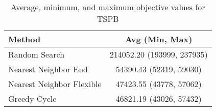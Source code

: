 \begin{table}[h!]
\centering
\begin{tabular}{lc}
\hline
Method & Avg (Min, Max) \\
\hline
Random Search & 214052.20 (193999, 237935) \\
Nearest Neighbor End & 54390.43 (52319, 59030) \\
Nearest Neighbor Flexible & 47423.55 (43778, 57062) \\
Greedy Cycle & 46821.19 (43026, 57432) \\
\hline
\end{tabular}
\caption{Average, minimum, and maximum objective values for TSPB}
\label{tab:TSPB_results}
\end{table}

